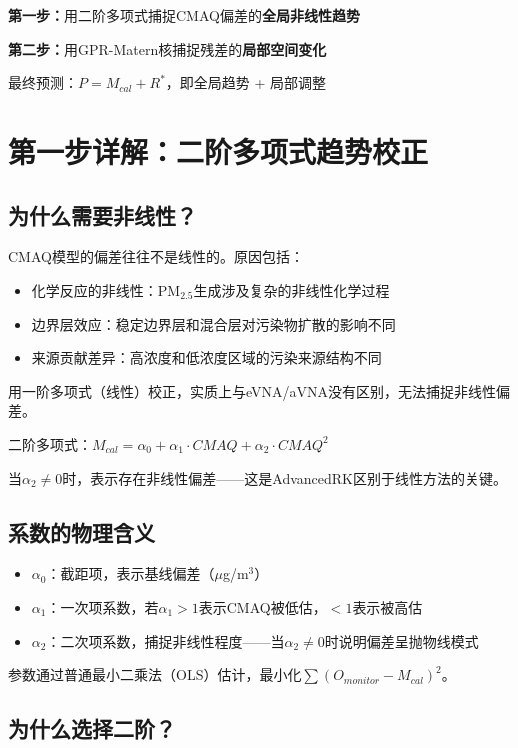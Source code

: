 \documentclass[UTF8, a4paper, 12pt]{article}
\begin{document}
\textbf{第一步：}用二阶多项式捕捉CMAQ偏差的\textbf{全局非线性趋势}

\textbf{第二步：}用GPR-Matern核捕捉残差的\textbf{局部空间变化}

最终预测：$P = M_{cal} + R^*$，即全局趋势 + 局部调整

\section{第一步详解：二阶多项式趋势校正}

\subsection{为什么需要非线性？}

CMAQ模型的偏差往往不是线性的。原因包括：
\begin{itemize}
    \item 化学反应的非线性：PM$_{2.5}$生成涉及复杂的非线性化学过程
    \item 边界层效应：稳定边界层和混合层对污染物扩散的影响不同
    \item 来源贡献差异：高浓度和低浓度区域的污染来源结构不同
\end{itemize}

用一阶多项式（线性）校正，实质上与eVNA/aVNA没有区别，无法捕捉非线性偏差。

二阶多项式：$M_{cal} = \alpha_0 + \alpha_1 \cdot CMAQ + \alpha_2 \cdot CMAQ^2$

当$\alpha_2 \neq 0$时，表示存在非线性偏差——这是AdvancedRK区别于线性方法的关键。

\subsection{系数的物理含义}

\begin{itemize}
    \item $\alpha_0$：截距项，表示基线偏差（$\mu$g/m$^3$）
    \item $\alpha_1$：一次项系数，若$\alpha_1 > 1$表示CMAQ被低估，$< 1$表示被高估
    \item $\alpha_2$：二次项系数，捕捉非线性程度——当$\alpha_2 \neq 0$时说明偏差呈抛物线模式
\end{itemize}

参数通过普通最小二乘法（OLS）估计，最小化$\sum(O_{monitor} - M_{cal})^2$。

\subsection{为什么选择二阶？}
\end{document}
